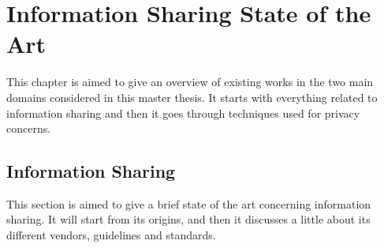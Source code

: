 \documentclass{eplmastersthesis}
\begin{document}
\chapter{Information Sharing State of the Art}

This chapter is aimed to give an overview of existing works in the two main domains considered in this master thesis. It starts with everything related to information sharing and then it goes through techniques used for privacy concerns.\\

\section{Information Sharing}
This section is aimed to give a brief state of the art concerning information sharing. It will start from its origins, and then it discusses a little about its different vendors, guidelines and standards.
\end{document}
